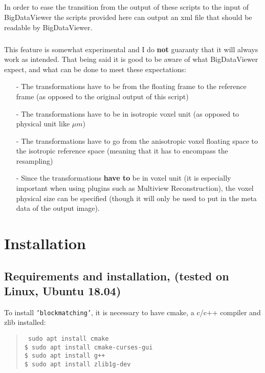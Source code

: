 \documentclass[10pt,a4paper]{book}
\newcommand{\option}[1]{{\texttt{'#1'}}}
\newenvironment{code}[1]{\mbox{}\\[1ex]\hspace*{-#1cm}\begin{minipage}{150mm}\begin{quote}\tt}{\end{quote}\end{minipage}\mbox{}\\[1ex]}
\begin{document}
\paragraph{}In order to ease the transition from the output of these scripts to the input of BigDataViewer the scripts provided here can output an xml file that should be readable by BigDataViewer.
\paragraph{}This feature is somewhat experimental and I do \textbf{not} guaranty that it will always work as intended. That being said it is good to be aware of what BigDataViewer expect, and what can be done to meet these expectations:
\begin{itemize}
\item[-] The transformations have to be from the floating frame to the reference frame (as opposed to the original output of this script)
\item[-] The transformations have to be in isotropic voxel unit (as opposed to physical unit like $\mu m$)
\item[-] The transformations have to go from the anisotropic voxel floating space to the isotropic reference space (meaning that it has to encompass the resampling)
\item[-] Since the transformations \textbf{have to} be in voxel unit (it is especially important when using plugins such as Multiview Reconstruction), the voxel physical size can be specified (though it will only be used to put in the meta data of the output image).
\end{itemize}
\chapter{Installation}
\section{Requirements and installation, (tested on Linux, Ubuntu 18.04)}
To install \option{blockmatching}, it is necessary to have cmake, a c/c++ compiler and zlib installed:
  \begin{code}{0.8}
    \$ sudo apt install cmake \\
    \$ sudo apt install cmake-curses-gui \\
    \$ sudo apt install g++ \\
    \$ sudo apt install zlib1g-dev
  \end{code}\\
  
\end{document}
